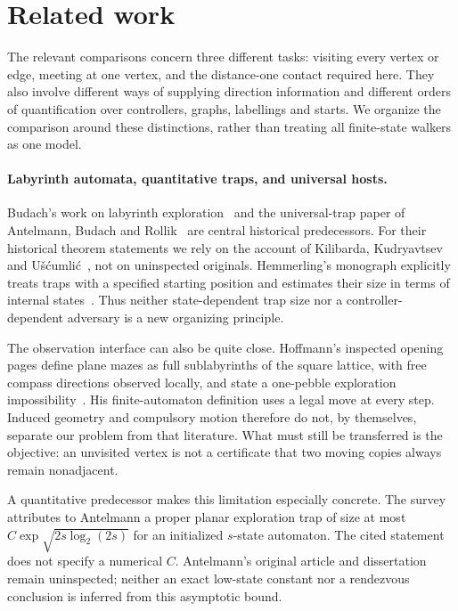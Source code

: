 \section{Related work}
\label{sec:related}

The relevant comparisons concern three different tasks: visiting every vertex or
edge, meeting at one vertex, and the distance-one contact required here. They also
involve different ways of supplying direction information and different orders of
quantification over controllers, graphs, labellings and starts. We organize the
comparison around these distinctions, rather than treating all finite-state walkers
as one model.

\paragraph{Labyrinth automata, quantitative traps, and universal hosts.}
Budach's work on labyrinth exploration~\cite{Budach1978} and the universal-trap
paper of Antelmann, Budach and Rollik~\cite{AntelmannBudachRollik1979} are central
historical predecessors. For their historical theorem statements we rely on the
account of Kilibarda, Kudryavtsev and U\v{s}\'{c}umli\'{c}~\cite{KilibardaKudryavtsevUscumlic2003},
not on uninspected originals. Hemmerling's monograph explicitly treats traps with a
specified starting position and estimates their size in terms of internal
states~\cite[pp.~133--134]{Hemmerling1989}. Thus neither state-dependent trap size
nor a controller-dependent adversary is a new organizing principle.

The observation interface can also be quite close. Hoffmann's inspected opening
pages define plane mazes as full sublabyrinths of the square lattice, with free
compass directions observed locally, and state a one-pebble exploration
impossibility~\cite[pp.~433--434]{Hoffmann1981}. His finite-automaton definition
uses a legal move at every step. Induced geometry and compulsory motion therefore
do not, by themselves, separate our problem from that literature. What must still
be transferred is the objective: an unvisited vertex is not a certificate that two
moving copies always remain nonadjacent.

A quantitative predecessor makes this limitation especially concrete.
The survey~\cite[Theorem~4, p.~25]{KilibardaKudryavtsevUscumlic2003} attributes to
Antelmann a proper planar exploration trap of size at most
$C\exp\sqrt{2s\log_2(2s)}$ for an initialized $s$-state automaton. The cited statement
does not specify a numerical $C$. Antelmann's original article and dissertation
remain uninspected; neither an exact low-state constant nor a rendezvous conclusion
is inferred from this asymptotic bound.

